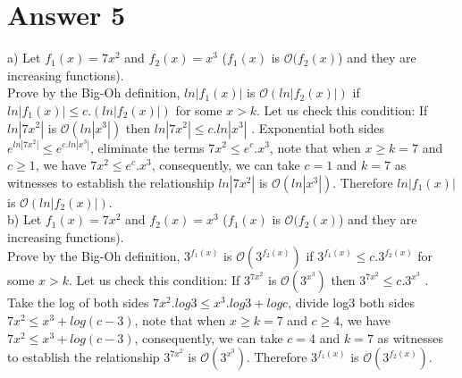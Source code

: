 \documentclass[12pt]{article}
\begin{document}
\section*{Answer 5}
\hspace{6mm}a)	Let $f_1(x) = 7x^2$ and $f_2(x)=x^3$ ($f_1(x)$ is $\mathcal{O}(f_2(x)$) and they are increasing functions). \\ 
Prove by the Big-Oh definition,  $ln|f_1(x)|$ is $\mathcal{O}(ln|f_2(x)|)$ if $ln|f_1(x)|\leq  c.(ln|f_2(x)|)$ for some $x>k$. Let us check this condition: If  $ln|7x^2|$ is $\mathcal{O}(ln|x^3|)$ then $ln|7x^2|\leq c.ln|x^3|$ . Exponential both sides  $e^{ln|7x^2|} \leq e^{c.ln|x^3|}$, eliminate the terms  $7x^2 \leq e^c.x^3$, note that when $x\geq k=7$ and $c \geq 1$, we have $7x^2 \leq e^c.x^3$, consequently, we can take $c=1$ and $k=7$ as witnesses to establish the relationship $ln|7x^2|$ is $\mathcal{O}(ln|x^3|)$. Therefore $ln|f_1(x)|$ is $\mathcal{O}(ln|f_2(x)|)$.\\

b)	Let $f_1(x) = 7x^2$ and $f_2(x)=x^3$ ($f_1(x)$ is $\mathcal{O}(f_2(x)$) and they are increasing functions). \\
Prove by the Big-Oh definition, $3^{f_1(x)}$ is $\mathcal{O}(3^{f_2(x)})$ if  $3^{f_1(x)} \leq c.3^{f_2(x)}$ for some $x>k$. Let us check this condition: If $3^{7x^2}$ is $\mathcal{O}(3^{x^3})$ then $3^{7x^2} \leq c.3^{x^3}$ . Take the log of both sides $7x^2.log3 \leq x^3.log3+logc$, divide log3 both sides $7x^2 \leq x^3 + log(c-3)$, note that when $x\geq k=7$ and $c \geq 4$, we have $7x^2 \leq x^3 + log(c-3)$, consequently, we can take $c=4$ and $k=7$ as witnesses to establish the relationship $3^{7x^2}$ is $\mathcal{O}(3^{x^3})$. Therefore $3^{f_1(x)}$ is $\mathcal{O}(3^{f_2(x)})$.\\
\end{document}
